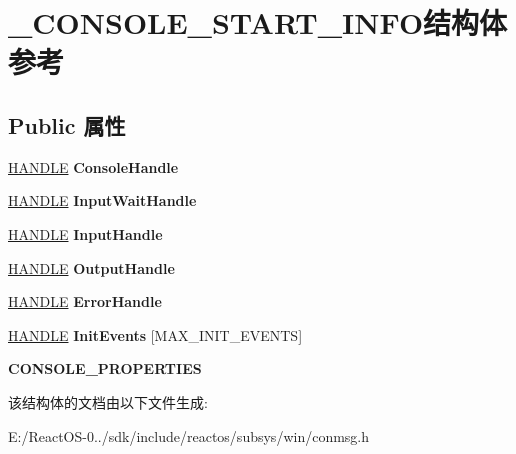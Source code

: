 \hypertarget{struct___c_o_n_s_o_l_e___s_t_a_r_t___i_n_f_o}{}\section{\+\_\+\+C\+O\+N\+S\+O\+L\+E\+\_\+\+S\+T\+A\+R\+T\+\_\+\+I\+N\+F\+O结构体 参考}
\label{struct___c_o_n_s_o_l_e___s_t_a_r_t___i_n_f_o}
\subsection*{Public 属性}
\begin{DoxyCompactItemize}
\item 
\mbox{\label{struct___c_o_n_s_o_l_e___s_t_a_r_t___i_n_f_o_a223a4827cd7f6e11d94e54dcc43ab168}} 
\hyperlink{interfacevoid}{H\+A\+N\+D\+LE} {\bfseries Console\+Handle}
\item 
\mbox{\label{struct___c_o_n_s_o_l_e___s_t_a_r_t___i_n_f_o_a1c1ba3985981f43e4c714a0552adf1dc}} 
\hyperlink{interfacevoid}{H\+A\+N\+D\+LE} {\bfseries Input\+Wait\+Handle}
\item 
\mbox{\label{struct___c_o_n_s_o_l_e___s_t_a_r_t___i_n_f_o_a29dc7fc9fed5ea9ea2c996f6d3f69ba3}} 
\hyperlink{interfacevoid}{H\+A\+N\+D\+LE} {\bfseries Input\+Handle}
\item 
\mbox{\label{struct___c_o_n_s_o_l_e___s_t_a_r_t___i_n_f_o_a94e97810d03a59f9948fc5eb00089e29}} 
\hyperlink{interfacevoid}{H\+A\+N\+D\+LE} {\bfseries Output\+Handle}
\item 
\mbox{\label{struct___c_o_n_s_o_l_e___s_t_a_r_t___i_n_f_o_a0a5d9bd0be5f2406e824e7d771adaeb5}} 
\hyperlink{interfacevoid}{H\+A\+N\+D\+LE} {\bfseries Error\+Handle}
\item 
\mbox{\label{struct___c_o_n_s_o_l_e___s_t_a_r_t___i_n_f_o_a9eaf5ca23692bb6f51c394e8434990bc}} 
\hyperlink{interfacevoid}{H\+A\+N\+D\+LE} {\bfseries Init\+Events} \mbox{[}M\+A\+X\+\_\+\+I\+N\+I\+T\+\_\+\+E\+V\+E\+N\+TS\mbox{]}
\item 
\mbox{\label{struct___c_o_n_s_o_l_e___s_t_a_r_t___i_n_f_o_aa8679b30d644e2493bcfa7fe1f1678cd}} 
{\bfseries C\+O\+N\+S\+O\+L\+E\+\_\+\+P\+R\+O\+P\+E\+R\+T\+I\+ES}
\end{DoxyCompactItemize}


该结构体的文档由以下文件生成\+:\begin{DoxyCompactItemize}
\item 
E\+:/\+React\+O\+S-\/0../sdk/include/reactos/subsys/win/conmsg.\+h\end{DoxyCompactItemize}
